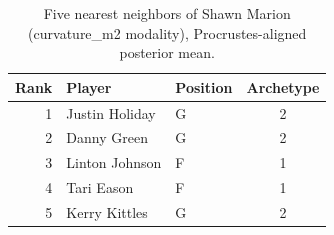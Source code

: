 \begin{table}[htbp]
  \centering\small
  \begin{tabular}{rllc}
    \toprule
    Rank & Player & Position & Archetype \\
    \midrule
    1 & Justin Holiday & G & 2 \\
    2 & Danny Green & G & 2 \\
    3 & Linton Johnson & F & 1 \\
    4 & Tari Eason & F & 1 \\
    5 & Kerry Kittles & G & 2 \\
    \bottomrule
  \end{tabular}
  \caption{Five nearest neighbors of Shawn Marion (curvature_m2 modality), Procrustes-aligned posterior mean.}
  \label{tab:Shawn_Marion_neighbors_curvature_m2}
\end{table}

